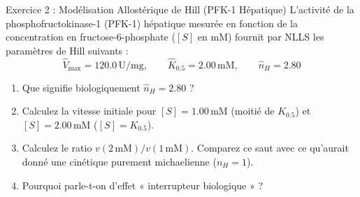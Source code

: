 \documentclass[11pt,a4paper]{article}
\begin{document}
\begin{exercicebox}{Exercice 2 : Modélisation Allostérique de Hill (PFK-1 Hépatique)}
L'activité de la phosphofructokinase-1 (PFK-1) hépatique mesurée en fonction de la concentration en fructose-6-phosphate ($[S]$ en mM) fournit par NLLS les paramètres de Hill suivants :
\begin{equation*}
  \hat{V}_{\max} = 120.0\,\text{U/mg}, \qquad \hat{K}_{0.5} = 2.00\,\text{mM}, \qquad \hat{n}_H = 2.80
\end{equation*}
\begin{enumerate}[label=\textbf{\alph*.}]
  \item Que signifie biologiquement $\hat{n}_H = 2.80$ ?
  \item Calculez la vitesse initiale pour $[S] = 1.00\,\text{mM}$ (moitié de $K_{0.5}$) et $[S] = 2.00\,\text{mM}$ ($[S] = K_{0.5}$).
  \item Calculez le ratio $v(2\,\text{mM}) / v(1\,\text{mM})$. Comparez ce saut avec ce qu'aurait donné une cinétique purement michaelienne ($n_H = 1$).
  \item Pourquoi parle-t-on d'effet « interrupteur biologique » ?
\end{enumerate}
\end{exercicebox}
\end{document}
